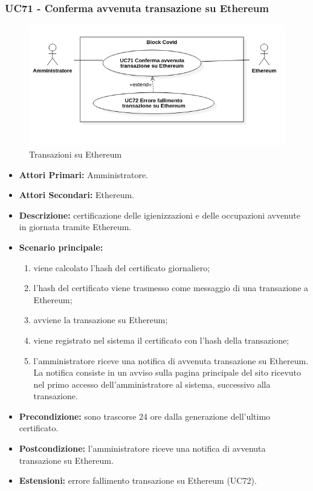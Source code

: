\subsubsection{UC71 - Conferma avvenuta transazione su Ethereum}
\begin{figure}[H]
	\centering
	\includegraphics[width=15cm]{res/images/UC71-72.png}
	\caption{Transazioni su Ethereum}
	\label{fig:Transazioni su Ethereum}
\end{figure}
\begin{itemize}
	\item\textbf{Attori Primari:} Amministratore.
	\item\textbf{Attori Secondari:} Ethereum.
	\item\textbf{Descrizione:} certificazione delle igienizzazioni e delle occupazioni avvenute in giornata tramite Ethereum.
	\item\textbf{Scenario principale:}
	\begin{enumerate}
		\item viene calcolato l'hash del certificato giornaliero;
		\item l'hash del certificato viene trasmesso come messaggio di una transazione a Ethereum;
		\item avviene la transazione su Ethereum;
		\item viene registrato nel sistema il certificato con l'hash della transazione;
		\item l'amministratore riceve una notifica di avvenuta transazione su Ethereum. La notifica consiste in un avviso sulla pagina principale del sito ricevuto nel primo accesso dell'amministratore al sistema, successivo alla transazione.
	\end{enumerate}
	\item\textbf{Precondizione:} sono trascorse 24 ore dalla generazione dell'ultimo certificato.   
	\item\textbf{Postcondizione:} l'amministratore riceve una notifica di avvenuta transazione su Ethereum.
	\item\textbf{Estensioni:} errore fallimento transazione su Ethereum (UC72).
\end{itemize}

